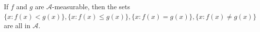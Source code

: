 If $f$ and $g$ are $\mathcal{A}$-measurable, then the sets $\{x : f(x) < g(x)\}, \{x : f(x) \leq g(x)\}, \{x : f(x) = g(x)\}, \{x : f(x) \neq g(x)\}$ are all in $\mathcal{A}$.
